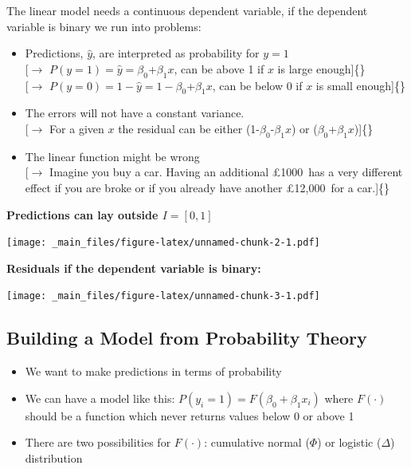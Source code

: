 \documentclass[]{article}
\providecommand{\tightlist}{%
  \setlength{\itemsep}{0pt}\setlength{\parskip}{0pt}}
\theoremstyle{definition}
\theoremstyle{definition}
\theoremstyle{remark}
\begin{document}
The linear model needs a continuous dependent variable, if the dependent
variable is binary we run into problems:

\begin{itemize}
\item
  Predictions, \(\hat y\), are interpreted as probability for \(y=1\)\\
  {[}\(\rightarrow\) \(P(y=1) = \hat y = \beta_0\)+\(\beta_1 x\), can be
  above 1 if \(x\) is large enough{]}\{\}\\
  {[}\(\rightarrow\) \(P(y=0) = 1- \hat y = 1 - \beta_0\)+\(\beta_1 x\),
  can be below 0 if \(x\) is small enough{]}\{\}
\item
  The errors will not have a constant variance.\\
  {[}\(\rightarrow\) For a given \(x\) the residual can be either
  (1-\(\beta_0\)-\(\beta_1 x\)) or (\(\beta_0\)+\(\beta_1 x\)){]}\{\}
\item
  The linear function might be wrong\\
  {[}\(\rightarrow\) Imagine you buy a car. Having an additional
  £1000~has a very different effect if you are broke or if you already
  have another £12,000~for a car.{]}\{\}
\end{itemize}

\textbf{Predictions can lay outside \(I=[0,1]\)}

\texttt{[image: \_main\_files/figure-latex/unnamed-chunk-2-1.pdf]}

\textbf{Residuals if the dependent variable is binary:}

\texttt{[image: \_main\_files/figure-latex/unnamed-chunk-3-1.pdf]}

\subsection{Building a Model from Probability
Theory}\label{building-a-model-from-probability-theory}

\begin{itemize}
\tightlist
\item
  We want to make predictions in terms of probability
\item
  We can have a model like this: \(P(y_i=1)={F(\beta_0 + \beta_1 x_i)}\)
  where \(F(\cdot)\) should be a function which never returns values
  below 0 or above 1
\item
  There are two possibilities for \(F(\cdot)\): cumulative normal
  (\(\Phi\)) or logistic (\(\Delta\)) distribution
\end{itemize}
\end{document}
